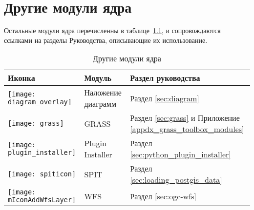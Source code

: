 
\chapter{Другие модули ядра}


Остальные модули ядра перечисленны в таблице~\ref{tab:other_core}, и
сопровождаются ссылками на разделы Руководства, описывающие их использование.

\begin{table}[H]
\centering
 \begin{tabular}{|l|l|p{8cm}|}
\hline \textbf{Иконка} & \textbf{Модуль} & \textbf{Раздел руководства}\\
\hline
\texttt{[image: diagram\_overlay]}
 & Наложение диаграмм \index{plugins!diagram}& Раздел \ref{sec:diagram}\\
\hline
\texttt{[image: grass]}
 & GRASS \index{plugin!grass toolbox} & Раздел \ref{sec:grass} и Приложение \ref{appdx_grass_toolbox_modules}\\
 \hline
\texttt{[image: plugin\_installer]}
 & Plugin Installer \index{plugins!Plugin Installer} & Раздел \ref{sec:python_plugin_installer}\\
\hline
\texttt{[image: spiticon]}
 & SPIT \index{plugins!spit}& Раздел \ref{sec:loading_postgis_data} \\
 \hline
\texttt{[image: mIconAddWfsLayer]}
 & WFS & Раздел \ref{sec:ogc-wfs} \\
\hline
\end{tabular}
\caption{Другие модули ядра}\label{tab:other_core}
\end{table}
